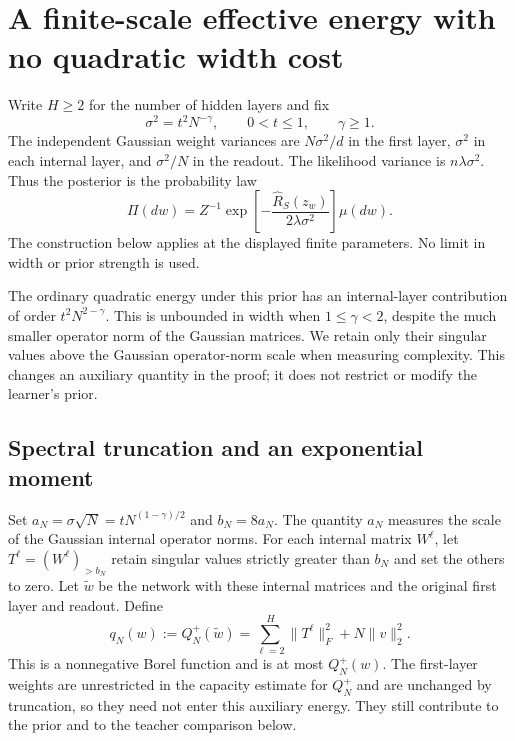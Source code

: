 \section{A finite-scale effective energy with no quadratic width cost}
\label{sec:effective-energy}

Write $H\geq2$ for the number of hidden layers and fix
\[
  \sigma^2=t^2N^{-\gamma},\qquad 0<t\leq1,\qquad\gamma\geq1.
\]
The independent Gaussian weight variances are $N\sigma^2/d$ in the
first layer, $\sigma^2$ in each internal layer, and $\sigma^2/N$ in
the readout.  The likelihood variance is $n\lambda\sigma^2$.  Thus the
posterior is the probability law
\begin{equation}
 \Pi(dw)=Z^{-1}\exp\left[-\frac{\widehat R_S(z_w)}{2\lambda\sigma^2}\right]
 \mu(dw).
 \label{eq:effective-posterior}
\end{equation}
The construction below applies at the displayed finite parameters.
No limit in width or prior strength is used.

The ordinary quadratic energy under this prior has an internal-layer
contribution of order $t^2N^{2-\gamma}$.  This is unbounded in width
when $1\leq\gamma<2$, despite the much smaller operator norm of the
Gaussian matrices.  We retain only their singular values above the
Gaussian operator-norm scale when measuring complexity.  This changes
an auxiliary quantity in the proof; it does not restrict or modify the
learner's prior.

\subsection{Spectral truncation and an exponential moment}

Set $a_N=\sigma\sqrt N=tN^{(1-\gamma)/2}$ and $b_N=8a_N$.
The quantity $a_N$ measures the scale of the Gaussian internal
operator norms.  For each internal
matrix $W^\ell$, let $T^\ell=(W^\ell)_{>b_N}$ retain singular values
strictly greater than $b_N$ and set the others to zero.  Let
$\widetilde w$ be the network with these internal matrices and the
original first layer and readout.  Define
\begin{equation}
 q_N(w):=Q_N^+(\widetilde w)
 =\sum_{\ell=2}^H\|T^\ell\|_F^2+N\|v\|_2^2.
 \label{eq:effective-energy}
\end{equation}
This is a nonnegative Borel function and is at most $Q_N^+(w)$.
The first-layer weights are unrestricted in the capacity estimate
for $Q_N^+$ and are unchanged by truncation, so they need not enter
this auxiliary energy.  They still contribute to the prior and to
the teacher comparison below.

